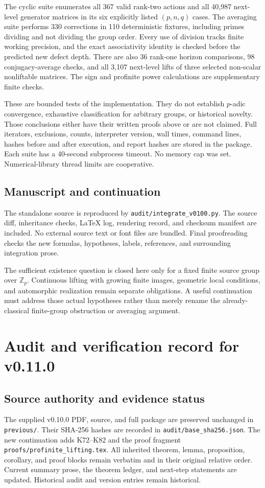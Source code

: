\documentclass[11pt]{article}
\theoremstyle{definition}
\theoremstyle{remark}
\begin{document}
The cyclic suite enumerates all 367 valid rank-two actions and all 40,987 next-level generator matrices in its six explicitly listed $(p,n,q)$ cases. The averaging suite performs 330 corrections in 110 deterministic fixtures, including primes dividing and not dividing the group order. Every use of division tracks finite working precision, and the exact associativity identity is checked before the predicted new defect depth. There are also 36 rank-one horizon comparisons, 98 conjugacy-average checks, and all 3,107 next-level lifts of three selected non-scalar nonliftable matrices. The sign and profinite power calculations are supplementary finite checks.

These are bounded tests of the implementation. They do not establish $p$-adic convergence, exhaustive classification for arbitrary groups, or historical novelty. Those conclusions either have their written proofs above or are not claimed. Full iterators, exclusions, counts, interpreter version, wall times, command lines, hashes before and after execution, and report hashes are stored in the package. Each suite has a 40-second subprocess timeout. No memory cap was set. Numerical-library thread limits are cooperative.

\subsection{Manuscript and continuation}
The standalone source is reproduced by \texttt{audit/integrate\_v0100.py}. The source diff, inheritance checks, LaTeX log, rendering record, and checksum manifest are included. No external source text or font files are bundled. Final proofreading checks the new formulas, hypotheses, labels, references, and surrounding integration prose.

The sufficient existence question is closed here only for a fixed finite source group over $\mathbb Z_p$. Continuous lifting with growing finite images, geometric local conditions, and automorphic realization remain separate obligations. A useful continuation must address those actual hypotheses rather than merely rename the already-classical finite-group obstruction or averaging argument.

\clearpage
\section{Audit and verification record for v0.11.0}\label{app:audit-v0110}

\subsection{Source authority and evidence status}
The supplied v0.10.0 PDF, source, and full package are preserved unchanged in \texttt{previous/}. Their SHA-256 hashes are recorded in \texttt{audit/base\_sha256.json}. The new continuation adds K72--K82 and the proof fragment \texttt{proofs/profinite\_lifting.tex}. All inherited theorem, lemma, proposition, corollary, and proof blocks remain verbatim and in their original relative order. Current summary prose, the theorem ledger, and next-step statements are updated. Historical audit and version entries remain historical.
\end{document}
